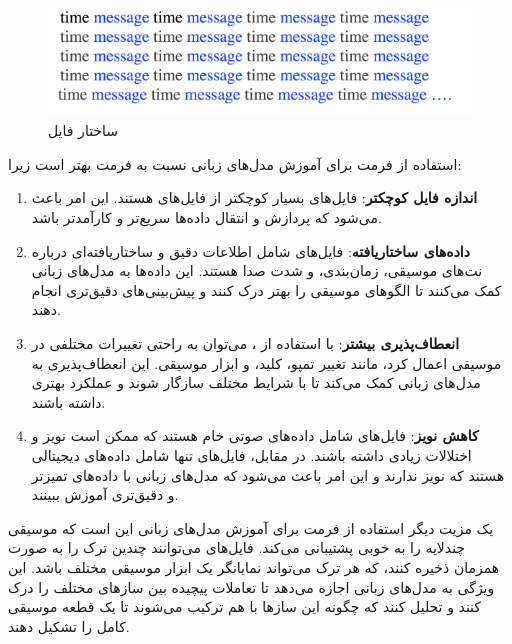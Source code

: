 \begin{figure}[!htb]
      \centering
      \includegraphics[scale=1]{Figures/Screenshot 2024-08-29 021655.png}
      \caption{ساختار فایل 
      }
      \label{Fig:MIDI}
\end{figure}

استفاده از فرمت  برای آموزش مدل‌های زبانی نسبت به فرمت  بهتر است زیرا:

\begin{enumerate}
      \def\labelenumi{\arabic{enumi}.}
      \item
            \textbf{اندازه فایل کوچکتر}: فایل‌های  بسیار کوچکتر از فایل‌های 
            هستند. این امر باعث می‌شود که پردازش و انتقال داده‌ها سریع‌تر و کارآمدتر
            باشد.
      \item
            \textbf{داده‌های ساختاریافته}: فایل‌های  شامل اطلاعات دقیق و
            ساختاریافته‌ای درباره نت‌های موسیقی، زمان‌بندی، و شدت صدا هستند. این
            داده‌ها به مدل‌های زبانی کمک می‌کنند تا الگوهای موسیقی را بهتر درک کنند و
            پیش‌بینی‌های دقیق‌تری انجام دهند.
      \item
            \textbf{انعطاف‌پذیری بیشتر}: با استفاده از ، می‌توان به راحتی
            تغییرات مختلفی در موسیقی اعمال کرد، مانند تغییر تمپو، کلید، و ابزار
            موسیقی. این انعطاف‌پذیری به مدل‌های زبانی کمک می‌کند تا با شرایط مختلف
            سازگار شوند و عملکرد بهتری داشته باشند.
      \item
            \textbf{کاهش نویز}: فایل‌های  شامل داده‌های صوتی خام هستند که ممکن
            است نویز و اختلالات زیادی داشته باشند. در مقابل، فایل‌های  تنها
            شامل داده‌های دیجیتالی هستند که نویز ندارند و این امر باعث می‌شود که
            مدل‌های زبانی با داده‌های تمیزتر و دقیق‌تری آموزش ببینند.
\end{enumerate}

یک مزیت دیگر استفاده از فرمت  برای آموزش مدل‌های زبانی این است که موسیقی چندلایه را به خوبی پشتیبانی می‌کند. فایل‌های  می‌توانند چندین ترک  را به صورت همزمان ذخیره کنند، که هر ترک می‌تواند نمایانگر یک ابزار موسیقی مختلف باشد. این ویژگی به مدل‌های زبانی اجازه می‌دهد تا تعاملات پیچیده بین سازهای مختلف را درک کنند و تحلیل کنند که چگونه این سازها با هم ترکیب می‌شوند تا یک قطعه موسیقی کامل را تشکیل دهند.

